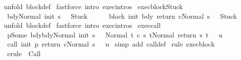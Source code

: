 \begin{isabellebody}
%
\isadelimproof
%
\endisadelimproof
%
\isatagproof
{}\isamarkupfalse%
\ {\isacharparenleft}unfold\ block{\isacharunderscore}def{\isacharparenright}\isanewline
{}\isamarkupfalse%
\ {\isacharparenleft}fastforce\ intro{\isacharcolon}\ exec{\isachardot}intros{\isacharparenright}%
\endisatagproof
{\isafoldproof}%
%
\isadelimproof
\isanewline
%
\endisadelimproof
\isanewline
{}\isamarkupfalse%
\ exec{\isacharunderscore}blockStuck{\isacharcolon}\isanewline
\ \ {\isachardoublequoteopen}{\isasymlbrakk}{\isasymGamma}{\isasymturnstile}{\isasymlangle}bdy{\isacharcomma}Normal\ {\isacharparenleft}init\ s{\isacharparenright}{\isasymrangle}\ {\isasymRightarrow}\ \ Stuck{\isasymrbrakk}\isanewline
\ \ {\isasymLongrightarrow}\ \isanewline
\ \ {\isasymGamma}{\isasymturnstile}{\isasymlangle}block\ init\ bdy\ return\ c{\isacharcomma}Normal\ s{\isasymrangle}\ {\isasymRightarrow}\ \ Stuck{\isachardoublequoteclose}\isanewline
%
\isadelimproof
%
\endisadelimproof
%
\isatagproof
{}\isamarkupfalse%
\ {\isacharparenleft}unfold\ block{\isacharunderscore}def{\isacharparenright}\isanewline
{}\isamarkupfalse%
\ {\isacharparenleft}fastforce\ intro{\isacharcolon}\ exec{\isachardot}intros{\isacharparenright}%
\endisatagproof
{\isafoldproof}%
%
\isadelimproof
\isanewline
%
\endisadelimproof
\isanewline
{}\isamarkupfalse%
\ exec{\isacharunderscore}call{\isacharcolon}\ \ \ \isanewline
\ {\isachardoublequoteopen}{\isasymlbrakk}{\isasymGamma}\ p{\isacharequal}Some\ bdy{\isacharsemicolon}{\isasymGamma}{\isasymturnstile}{\isasymlangle}bdy{\isacharcomma}Normal\ {\isacharparenleft}init\ s{\isacharparenright}{\isasymrangle}\ {\isasymRightarrow}\ \ Normal\ t{\isacharsemicolon}\ {\isasymGamma}{\isasymturnstile}{\isasymlangle}c\ s\ t{\isacharcomma}Normal\ {\isacharparenleft}return\ s\ t{\isacharparenright}{\isasymrangle}\ {\isasymRightarrow}\ \ u{\isasymrbrakk}\ \isanewline
\ \ {\isasymLongrightarrow}\ \isanewline
\ \ {\isasymGamma}{\isasymturnstile}{\isasymlangle}call\ init\ p\ return\ c{\isacharcomma}Normal\ s{\isasymrangle}\ {\isasymRightarrow}\ \ u{\isachardoublequoteclose}\isanewline
%
\isadelimproof
%
\endisadelimproof
%
\isatagproof
{}\isamarkupfalse%
\ {\isacharparenleft}simp\ add{\isacharcolon}\ call{\isacharunderscore}def{\isacharparenright}\isanewline
{}\isamarkupfalse%
\ {\isacharparenleft}rule\ exec{\isacharunderscore}block{\isacharparenright}\isanewline
{}\isamarkupfalse%
\ \ {\isacharparenleft}erule\ {\isacharparenleft}{}{\isacharparenright}\ Call{\isacharparenright}\isanewline

\end{isabellebody}
